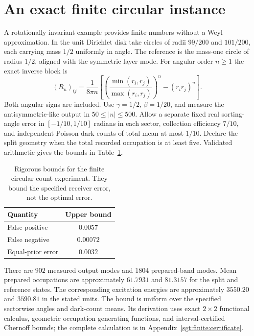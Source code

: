 \documentclass[aps,pra,reprint,superscriptaddress,longbibliography]{revtex4-2}
\begin{document}
\section{An exact finite circular instance}
\label{sgt:main:finite}

A rotationally invariant example provides finite numbers without a
Weyl approximation. In the unit Dirichlet disk take circles of radii
$99/200$ and $101/200$, each carrying mass $1/2$ uniformly in angle.
The reference is the mass-one circle of radius $1/2$, aligned with
the symmetric layer mode. For angular order $n\ge1$ the exact inverse
block is
\begin{equation}
 (R_n)_{ij}=\frac1{8\pi n}
 \left[\left(\frac{\min(r_i,r_j)}{\max(r_i,r_j)}\right)^n
                         -(r_ir_j)^n\right].
 \label{sgt:main:circle}
\end{equation}
Both angular signs are included. Use $\gamma=1/2$, $\beta=1/20$,
and measure the antisymmetric-like output in $50\le|n|\le500$.
Allow a separate fixed real sorting-angle error in
$[-1/10,1/10]$ radians in each sector, collection efficiency $7/10$,
and independent Poisson dark counts of total mean at most $1/10$.
Declare the split geometry when the total recorded occupation is at
least five. Validated arithmetic gives the bounds in Table~\ref{sgt:main:table}.
\begin{table}[b]
 \caption{Rigorous bounds for the finite circular count experiment.
 They bound the specified receiver error, not the optimal error.}
 \label{sgt:main:table}
 \begin{ruledtabular}
 \begin{tabular}{lc}
 Quantity & Upper bound\\
 \hline
 False positive & $0.0057$\\
 False negative & $0.00072$\\
 Equal-prior error & $0.0032$
 \end{tabular}
 \end{ruledtabular}
\end{table}
There are $902$ measured output modes and $1804$ prepared-band modes.
Mean prepared occupations are approximately $61.7931$ and $81.3157$
for the split and reference states. The corresponding excitation
energies are approximately $3550.20$ and $3590.81$ in the stated units.
The bound is uniform over the specified sectorwise angles and dark-count
means. Its derivation uses exact $2\times2$ functional calculus,
geometric occupation generating functions, and interval-certified
Chernoff bounds; the complete calculation is in
Appendix~\ref{sgt:finite:certificate}.
\end{document}
